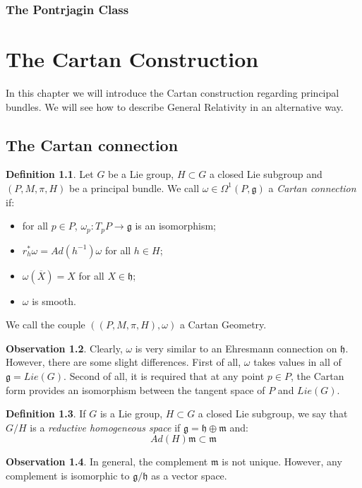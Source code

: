 \documentclass[12pt,a4paper]{report}
\theoremstyle{definition}
\newtheorem{Def}{Definition}[chapter]
\theoremstyle{Theorem}
\theoremstyle{definition}
\theoremstyle{definition}
\newtheorem{Obs}[Def]{Observation}
\begin{document}
			\subsection{The Pontrjagin Class}
		\chapter{The Cartan Construction}
		In this chapter we will introduce the Cartan construction regarding principal bundles. We will see how to describe General Relativity in an alternative way.
		\section{The Cartan connection}
		\begin{Def}
			Let $G$ be a Lie group, $H\subset G$ a closed Lie subgroup and $(P,M,\pi,H)$ be a principal bundle. We call $\omega\in\Omega^1(P,\mathfrak{g})$ a \textit{Cartan connection} if:
			\begin{itemize}
				\item for all $p\in P$, $\omega_p:T_pP\rightarrow \mathfrak{g}$ is an isomorphism;
				\item $r_h^*\omega=Ad(h^{-1})\omega$ for all $h\in H$;
				\item $\omega(\overline{X})=X$ for all $X\in \mathfrak{h}$;
				\item $\omega$ is smooth.
			\end{itemize}
			We call the couple $((P,M,\pi,H),\omega)$ a Cartan Geometry.
		\end{Def}
		\begin{Obs}
			Clearly, $\omega$ is very similar to an Ehresmann connection on $\mathfrak{h}$. However, there are some slight differences. First of all, $\omega$ takes values in all of $\mathfrak{g}=Lie(G)$. Second of all, it is required that at any point $p\in P$, the Cartan form provides an isomorphism between the tangent space of $P$ and $Lie(G)$.
		\end{Obs}
		\begin{Def}
			If $G$ is a Lie group, $H\subset G$ a closed Lie subgroup, we say that $G/H$ is a \textit{reductive homogeneous space} if $\mathfrak{g}=\mathfrak{h}\oplus\mathfrak{m}$ and:
			$$Ad(H)\mathfrak{m}\subset \mathfrak{m}$$ 
		\end{Def}
		\begin{Obs}
			In general, the complement $\mathfrak{m}$ is not unique. However, any complement is isomorphic to $\mathfrak{g/h}$ as a vector space.
		\end{Obs}
\end{document}
